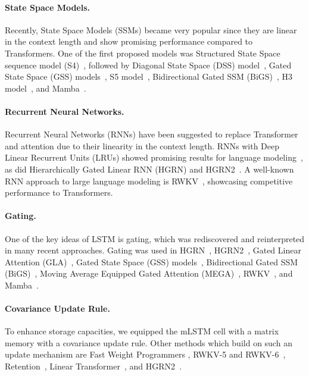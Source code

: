 \paragraph{State Space Models.} Recently, State Space Models (SSMs) became very popular since they are linear in the context length and show promising performance compared to Transformers. One of the first proposed models was Structured State Space sequence model (S4)~\citep{Gu:21}, followed by Diagonal State Space (DSS) model~\citep{Gupta:22}, Gated State Space (GSS) models~\citep{Mehta:22}, S5 model~\citep{Smith:22}, Bidirectional Gated SSM (BiGS)~\citep{Wang:22}, H3 model~\citep{Fu:23}, and Mamba~\citep{Gu:24arxiv}.

\paragraph{Recurrent Neural Networks.} Recurrent Neural Networks (RNNs) have been suggested to replace Transformer and attention due to their linearity in the context length. RNNs with Deep Linear Recurrent Units (LRUs) showed promising results for language modeling~\citep{Orvieto:23, De:24arxiv}, as did Hierarchically Gated Linear RNN (HGRN) \citep{Qin:23} and HGRN2~\citep{Qin:24arxiv}. A well-known RNN approach to large language modeling is RWKV~\citep{Peng:23arxivshort,Peng:24arxivshort}, showcasing competitive performance to Transformers.

\paragraph{Gating.}
One of the key ideas of LSTM is gating, which was rediscovered and reinterpreted in many recent approaches. Gating was used in HGRN~\citep{Qin:23}, HGRN2~\citep{Qin:24arxiv}, Gated Linear Attention (GLA)~\citep{Yang:23arxiv}, Gated State Space (GSS) models~\citep{Mehta:22}, Bidirectional Gated SSM (BiGS)~\citep{Wang:22}, Moving Average Equipped Gated Attention (MEGA)~\citep{Ma:22}, RWKV~\citep{Peng:23arxivshort}, and Mamba~\citep{Gu:24arxiv}.

\paragraph{Covariance Update Rule.} To enhance storage capacities, we equipped the mLSTM cell with a matrix memory with a covariance update rule. Other methods which build on such an update mechanism are Fast Weight Programmers \citep{Schmidhuber:92ncfastweights,Schlag:21}, RWKV-5 and RWKV-6~\citep{Peng:24arxivshort}, Retention~\citep{Sun:23arxiv}, Linear Transformer~\citep{Katharopoulos:20}, and HGRN2~\citep{Qin:24arxiv}.

